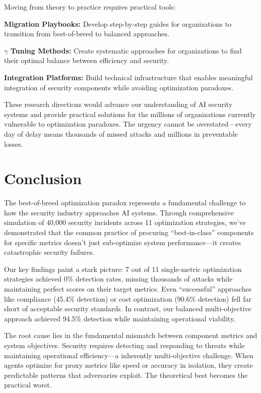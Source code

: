 \documentclass[10pt,conference]{IEEEtran}
\begin{document}
Moving from theory to practice requires practical tools:

\textbf{Migration Playbooks:} Develop step-by-step guides for organizations to transition from best-of-breed to balanced approaches.

\textbf{$\gamma$ Tuning Methods:} Create systematic approaches for organizations to find their optimal balance between efficiency and security.

\textbf{Integration Platforms:} Build technical infrastructure that enables meaningful integration of security components while avoiding optimization paradoxes.

These research directions would advance our understanding of AI security systems and provide practical solutions for the millions of organizations currently vulnerable to optimization paradoxes. The urgency cannot be overstated---every day of delay means thousands of missed attacks and millions in preventable losses.

\section{Conclusion}

The best-of-breed optimization paradox represents a fundamental challenge to how the security industry approaches AI systems. Through comprehensive simulation of 40,000 security incidents across 11 optimization strategies, we've demonstrated that the common practice of procuring ``best-in-class'' components for specific metrics doesn't just sub-optimize system performance---it creates catastrophic security failures.

Our key findings paint a stark picture: 7 out of 11 single-metric optimization strategies achieved 0\% detection rates, missing thousands of attacks while maintaining perfect scores on their target metrics. Even ``successful'' approaches like compliance (45.4\% detection) or cost optimization (90.6\% detection) fell far short of acceptable security standards. In contrast, our balanced multi-objective approach achieved 94.5\% detection while maintaining operational viability.

The root cause lies in the fundamental mismatch between component metrics and system objectives. Security requires detecting and responding to threats while maintaining operational efficiency---a inherently multi-objective challenge. When agents optimize for proxy metrics like speed or accuracy in isolation, they create predictable patterns that adversaries exploit. The theoretical best becomes the practical worst.
\end{document}
